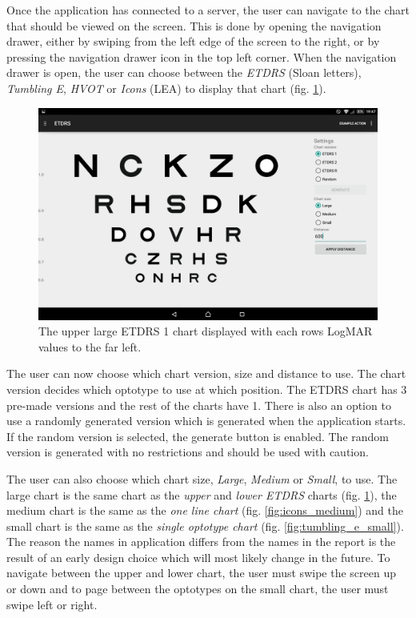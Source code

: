 \documentclass[12pt,a4paper,notitlepage]{report}
\begin{document}
Once the application has connected to a server, the user can navigate to the chart that should be viewed on the screen. This is done by opening the navigation drawer, either by swiping from the left edge of the screen to the right, or by pressing the navigation drawer icon in the top left corner. When the navigation drawer is open, the user can choose between the \textit{ETDRS} (Sloan letters), \textit{Tumbling E}, \textit{HVOT} or \textit{Icons} (LEA) to display that chart (fig. \ref{fig:etdrs_large}). 

\begin{figure}[ht!]
\centering
\includegraphics[width=120mm]{images/appgui/etdrs_large.png}
\caption{The upper large ETDRS 1 chart displayed with each rows LogMAR values to the far left.}
\label{fig:etdrs_large}
\end{figure}

The user can now choose which chart version, size and distance to use. The chart version decides which optotype to use at which position. The ETDRS chart has 3 pre-made versions\cite{Ferris} and the rest of the charts have 1. There is also an option to use a randomly generated version which is generated when the application starts. If the random version is selected, the generate button is enabled. The random version is generated with no restrictions and should be used with caution.

The user can also choose which chart size, \textit{Large}, \textit{Medium} or \textit{Small}, to use. The large chart is the same chart as the \textit{upper} and \textit{lower ETDRS} charts (fig. \ref{fig:etdrs_large}), the medium chart is the same as the \textit{one line chart} (fig. \ref{fig:icons_medium}) and the small chart is the same as the \textit{single optotype chart} (fig. \ref{fig:tumbling_e_small}). The reason the names in application differs from the names in the report is the result of an early design choice which will most likely change in the future. To navigate between the upper and lower chart, the user must swipe the screen up or down and to page between the optotypes on the small chart, the user must swipe left or right.
\end{document}
